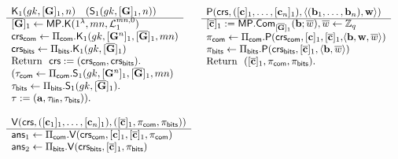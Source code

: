 \begin{figure} 
$$
\begin{array}{ll}
\begin{array}{l}
\algK_1(\gk,[\matr{G}]_1,n)\quad (\mathsf{S}_1(\gk,[\matr{G}]_1,n))\\
\hline\\[-.45cm]
[\overline{\matr{G}}]_1 \gets \MP.\algK(1^\lambda,mn,\distlin_1^{mn,0})\\
\crs_\sfcom\gets\Pi_\sfcom.\algK_1(\gk,[\vecb{G}^n]_1,[\ovG]_1, mn)\\
\crs_\sfbits\gets\Pi_\sfbits.\algK_1(\gk,[\overline{\matr{G}}]_1)\\
\text{Return } \ \mathsf{crs}:=(\crs_\sfcom,\crs_\sfbits).\\
(\tau_\sfcom\gets\Pi_\sfcom.\mathsf{S}_1(\gk,[\matr{G}^n]_1,[\ovG]_1,mn)\\
\tau_\sfbits\gets\Pi_\sfbits.\mathsf{S}_1(\gk,[\overline{\matr{G}}]_1).\\
\tau := (\vecb{a},\tau_\sflin,\tau_\sfbits)).\\
\\
\end{array}
&
\begin{array}{l}
{\algP(\mathsf{crs}, ([\vecb{c}]_1,\ldots,[\vecb{c}_n]_1), \langle (\vecb{b}_1,\ldots,\vecb{b}_n), \vecb{w}\rangle)}\\
\hline\\[-.45cm]
{[\ovecb{c}]_1 :=\MP.\Com_{[\ovG]_1}(\vecb{b};\overline{w})},\overline{w}\gets\Z_q\\
{\pi_\sfcom \gets \Pi_{\sfcom}.\algP(\crs_\sfcom,[\vecb{c}]_1,[\ovecb{c}]_1,}{\langle\vecb{b},\vecb{w},\overline{w}\rangle)}\\
\pi_\sfbits \gets \Pi_\sfbits.\algP(\crs_\sfbits,[\ovc]_1,\langle \vecb{b},\overline{w}\rangle)\\
\text{Return } \  ([\ovc]_1,\pi_\sfcom,\pi_\sfbits). \\
\\
\\
\\
\\
\end{array}\\
\begin{array}{l}
{\algV(\mathsf{crs},([\vecb{c}_1]_1,\ldots,[\vecb{c}_n]_1),([\ovc]_1,\pi_\sfcom,\pi_\sfbits))}\\
\hline
\mathsf{ans}_1 \gets \Pi_\sfcom.\algV(\crs_\sfcom,[\vecb{c}]_1,[\ovc]_1,\pi_\sfcom)\\
\mathsf{ans}_2 \gets \Pi_\sfbits.\algV(\crs_\sfbits,[\ovc]_1,\pi_\sfbits)\\

\end{array}
\end{array}$$
\end{figure}
